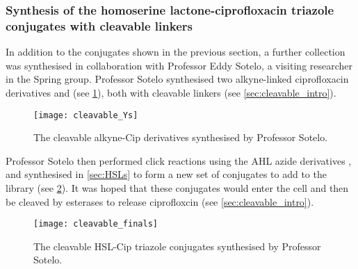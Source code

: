 \subsubsection{Synthesis of the homoserine lactone-ciprofloxacin triazole conjugates with cleavable linkers\label{sec:cleavable}}

%
%

In addition to the conjugates shown in the previous section, a further collection was synthesised in collaboration with Professor Eddy Sotelo, a visiting researcher in the Spring group. Professor Sotelo synthesised two alkyne-linked ciprofloxacin derivatives  and  (see \ref{fig:cleavable_Ys}), both with cleavable linkers (see \ref{sec:cleavable_intro}). 

\begin{figure}[H]
	\begin{center}
		\texttt{[image: cleavable\_Ys]}
		\caption{
			The cleavable alkyne-Cip derivatives synthesised by Professor Sotelo.
			\label{fig:cleavable_Ys}}
	\end{center}
\end{figure}

Professor Sotelo then performed click reactions using the AHL azide derivatives ,  and  synthesised in \ref{sec:HSLs} to form a new set of conjugates to add to the library (see \ref{fig:cleavable_finals}). It was hoped that these conjugates would enter the cell and then be cleaved by esterases to release ciprofloxcin (see \ref{sec:cleavable_intro}).

\begin{figure}[H]
	\begin{center}
		\texttt{[image: cleavable\_finals]}
		\caption{
			The cleavable HSL-Cip triazole conjugates synthesised by Professor Sotelo.
			\label{fig:cleavable_finals}}
	\end{center}
\end{figure}

